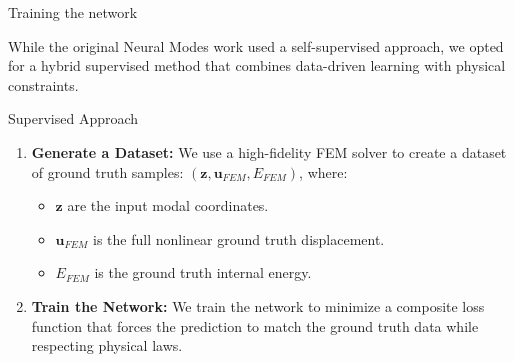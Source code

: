 \documentclass{beamer}
\begin{document}
\begin{frame}[allowframebreaks]{Training the network}
    
    While the original Neural Modes work \cite{Wang_Du_Coros_Thomaszewski_2024} used a self-supervised approach, we opted for a hybrid supervised method that combines data-driven learning with physical constraints.
    
    \begin{block}{Supervised Approach}
        \begin{enumerate}
            \item \textbf{Generate a Dataset:} We use a high-fidelity FEM solver to create a dataset of ground truth samples: \( (\mathbf{z}, \bm{u}_{FEM}, E_{FEM}) \), where:
            \begin{itemize}
                \item \( \mathbf{z} \) are the input modal coordinates.
                \item \( \bm{u}_{FEM} \) is the full nonlinear ground truth displacement.
                \item \( E_{FEM} \) is the ground truth internal energy.
            \end{itemize}
            \item \textbf{Train the Network:} We train the network to minimize a composite loss function that forces the prediction to match the ground truth data while respecting physical laws.
        \end{enumerate}
    \end{block}
\end{frame}
\end{document}

